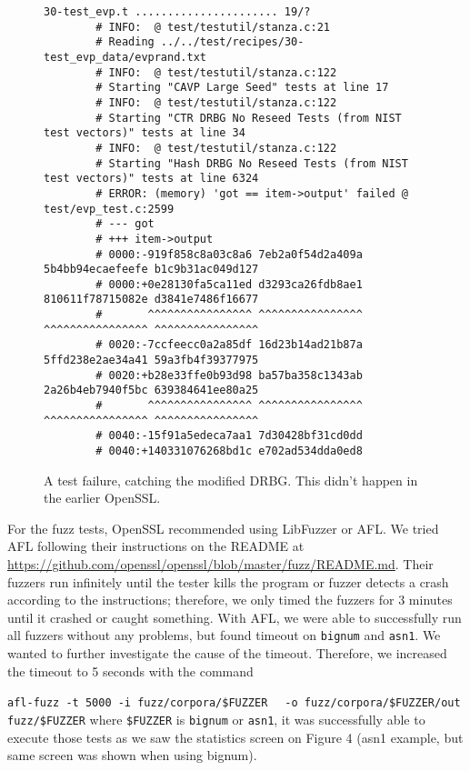 \documentclass[conference]{IEEEtran}
\begin{document}
\begin{figure*}[!t]

\centering
\begin{verbatim}
30-test_evp.t ...................... 19/? 
        # INFO:  @ test/testutil/stanza.c:21
        # Reading ../../test/recipes/30-test_evp_data/evprand.txt
        # INFO:  @ test/testutil/stanza.c:122
        # Starting "CAVP Large Seed" tests at line 17
        # INFO:  @ test/testutil/stanza.c:122
        # Starting "CTR DRBG No Reseed Tests (from NIST test vectors)" tests at line 34
        # INFO:  @ test/testutil/stanza.c:122
        # Starting "Hash DRBG No Reseed Tests (from NIST test vectors)" tests at line 6324
        # ERROR: (memory) 'got == item->output' failed @ test/evp_test.c:2599
        # --- got
        # +++ item->output
        # 0000:-919f858c8a03c8a6 7eb2a0f54d2a409a 5b4bb94ecaefeefe b1c9b31ac049d127
        # 0000:+0e28130fa5ca11ed d3293ca26fdb8ae1 810611f78715082e d3841e7486f16677
        #       ^^^^^^^^^^^^^^^^ ^^^^^^^^^^^^^^^^ ^^^^^^^^^^^^^^^^ ^^^^^^^^^^^^^^^^
        # 0020:-7ccfeecc0a2a85df 16d23b14ad21b87a 5ffd238e2ae34a41 59a3fb4f39377975
        # 0020:+b28e33ffe0b93d98 ba57ba358c1343ab 2a26b4eb7940f5bc 639384641ee80a25
        #       ^^^^^^^^^^^^^^^^ ^^^^^^^^^^^^^^^^ ^^^^^^^^^^^^^^^^ ^^^^^^^^^^^^^^^^
        # 0040:-15f91a5edeca7aa1 7d30428bf31cd0dd
        # 0040:+140331076268bd1c e702ad534dda0ed8
\end{verbatim}
\caption{A test failure, catching the modified DRBG. This didn't happen in the earlier OpenSSL.}
\label{testfailure}  
\end{figure*}

  For the fuzz tests, OpenSSL recommended using LibFuzzer or AFL.
We tried AFL following their instructions on the README at \url{https://github.com/openssl/openssl/blob/master/fuzz/README.md}.
Their fuzzers run infinitely until the tester kills
the program or fuzzer detects a crash
according to the instructions; therefore, we only
timed the fuzzers for 3 minutes until it crashed or caught something. With
AFL, we were able to successfully run all
fuzzers without any problems, but 
found timeout on \verb|bignum| and \verb|asn1|. We wanted
to further investigate the cause of the timeout. Therefore, we increased 
the timeout to 5 seconds with the command 

\verb|afl-fuzz -t 5000 -i fuzz/corpora/$FUZZER|
\verb|  -o fuzz/corpora/$FUZZER/out fuzz/$FUZZER|
where \verb|$FUZZER| is \verb|bignum| or \verb|asn1|, it was successfully able to execute those tests
as we saw the statistics screen on Figure 4 (asn1 example, but same screen was shown
when using bignum). 
  
\end{document}
